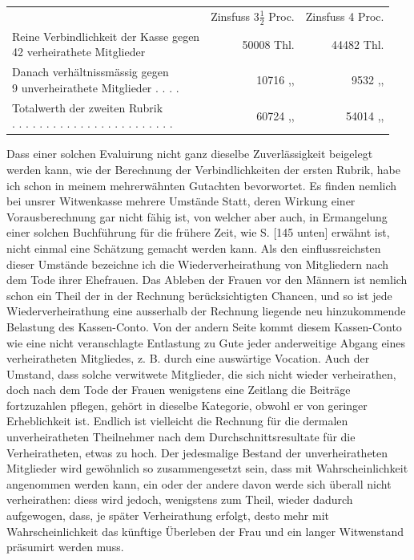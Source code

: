 \begin{center}
\footnotesize\setlength{\tabcolsep}{3pt}
\begin{tabular}{l r|r}
&Zinsfuss \(3\tfrac{1}{2}\) Proc.&Zinsfuss 4 Proc.\\
\shortstack[l]{Reine Verbindlichkeit der Kasse gegen\\42 verheirathete Mitglieder}&50008 Thl.&44482 Thl.\\
\shortstack[l]{Danach verhältnissmässig gegen\\9 unverheirathete Mitglieder . . . .}&10716 ,, &9532 ,, \\[5pt]
\shortstack[l]{Totalwerth der zweiten Rubrik\\ . . . . . . . . . . . . . . . . . . . . . . . .}&60724 ,, &54014 ,,
\end{tabular}
\end{center}
\noindent\hspace*{\parindent}Dass einer solchen Evaluirung nicht ganz dieselbe Zuverlässigkeit beigelegt werden kann, wie der Berechnung der Verbindlichkeiten der ersten Rubrik, habe ich schon in meinem mehrerwähnten Gutachten bevorwortet. Es finden nemlich bei unsrer Witwenkasse mehrere Umstände Statt, deren Wirkung einer Vorausberechnung gar nicht fähig ist, von welcher aber auch, in Ermangelung einer solchen Buchführung für die frühere Zeit, wie S. [145 unten] erwähnt ist, nicht einmal eine Schätzung gemacht werden kann. Als den einflussreichsten dieser Umstände bezeichne ich die Wiederverheirathung von Mitgliedern nach dem Tode ihrer Ehefrauen. Das Ableben der Frauen vor den Männern ist nemlich schon ein Theil der in der Rechnung berücksichtigten Chancen, und so ist jede Wiederverheirathung eine ausserhalb der Rechnung liegende neu hinzukommende Belastung des Kassen-Conto. Von der andern Seite kommt diesem Kassen-Conto wie eine nicht veranschlagte Entlastung zu Gute jeder anderweitige Abgang eines verheiratheten Mitgliedes, z. B. durch eine auswärtige Vocation. Auch der Umstand, dass solche verwitwete Mitglieder, die sich nicht wieder verheirathen, doch nach dem Tode der Frauen wenigstens eine Zeitlang die Beiträge fortzuzahlen pflegen, gehört in dieselbe Kategorie, obwohl er von geringer Erheblichkeit ist. Endlich ist vielleicht die Rechnung für die dermalen unverheiratheten Theilnehmer nach dem Durchschnittsresultate für die Verheiratheten, etwas zu hoch. Der jedesmalige Bestand der unverheiratheten Mitglieder wird gewöhnlich so zusammengesetzt sein, dass mit Wahrscheinlichkeit angenommen werden kann, ein oder der andere davon werde sich überall nicht verheirathen: diess wird jedoch, wenigstens zum Theil, wieder dadurch aufgewogen, dass, je später Verheirathung erfolgt, desto mehr mit Wahrscheinlichkeit das künftige Überleben der Frau und ein langer Witwenstand präsumirt werden muss.

